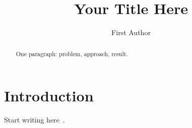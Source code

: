 \documentclass{llncs}
\title{Your Title Here}
\author{First Author\inst{1}}
\institute{Institution, City, Country \\ \email{email@example.org}}
\begin{document}
\maketitle

\begin{abstract}
One paragraph: problem, approach, result. %
\end{abstract}

\section{Introduction}
Start writing here~\cite{example2024}. %



\end{document}
